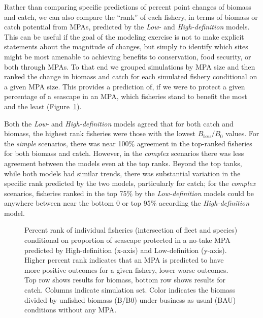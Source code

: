 \documentclass[
  default,
  lineno,
  referee]{sn-jnl}
\begin{document}
Rather than comparing specific predictions of percent point changes of
biomass and catch, we can also compare the ``rank'' of each fishery, in
terms of biomass or catch potential from MPAs, predicted by the
\emph{Low-} and \emph{High-definition} models. This can be useful if the
goal of the modeling exercise is not to make explicit statements about
the magnitude of changes, but simply to identify which sites might be
most amenable to achieving benefits to conservation, food security, or
both through MPAs. To that end we grouped simulations by MPA size and
then ranked the change in biomass and catch for each simulated fishery
conditional on a given MPA size. This provides a prediction of, if we
were to protect a given percentage of a seascape in an MPA, which
fisheries stand to benefit the most and the least
(Figure~\ref{fig-ranks}).

Both the \emph{Low-} and \emph{High-definition} models agreed that for
both catch and biomass, the highest rank fisheries were those with the
lowest \(B_{bau}/B_0\) values. For the \emph{simple} scenarios, there
was near 100\% agreement in the top-ranked fisheries for both biomass
and catch. However, in the \emph{complex} scenarios there was less
agreement between the models even at the top ranks. Beyond the top
tanks, while both models had similar trends, there was substantial
variation in the specific rank predicted by the two models, particularly
for catch; for the \emph{complex} scenarios, fisheries ranked in the top
75\% by the \emph{Low-definition} models could be anywhere between near
the bottom 0 or top 95\% according the \emph{High-definition} model.

\begin{figure}


\caption{\label{fig-ranks}Percent rank of individual fisheries
(intersection of fleet and species) conditional on proportion of
seascape protected in a no-take MPA predicted by High-definition
(x-axis) and Low-definition (y-axis). Higher percent rank indicates that
an MPA is predicted to have more positive outcomes for a given fishery,
lower worse outcomes. Top row shows results for biomass, bottom row
shows results for catch. Columns indicate simulation set. Color
indicates the biomass divided by unfished biomass (B/B0) under business
as usual (BAU) conditions without any MPA.}

\end{figure}%
\end{document}
